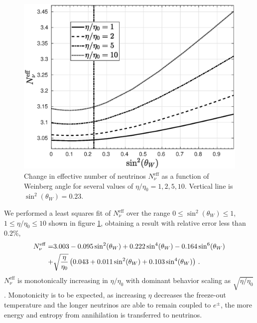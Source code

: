 \begin{figure}
\centerline{\includegraphics[width=0.90\columnwidth]{04-birrell/ParametricStudies/Figures/N_eff2.eps}}
\caption{Change in effective number of neutrinos  $N_\nu^{\mathrm{eff}}$ as a function of Weinberg angle for  several values of $\eta/\eta_0=1,2,5,10$. Vertical line is $\sin^2(\theta_W)=0.23$. }
\label{N_nu_params}  
 \end{figure}

We performed a least squares fit of $N_\nu^{\mathrm{eff}}$ over the range $0\leq \sin^2(\theta_W)\leq 1$, $1\leq \eta/\eta_0\leq 10$ shown in figure \ref{N_nu_params}, obtaining a result with relative error less than $0.2\%$,
\begin{align}
N_\nu^{\mathrm{eff}}=&3.003-0.095\sin^2(\theta_W) +0.222\sin^4(\theta_W ) -0.164\sin^6(\theta_W )\notag\\
+&\sqrt{\frac{\eta}{\eta_0}}\left(0.043+0.011\sin^2(\theta_W) +0.103\sin^4(\theta_W)\right)\,.
\end{align}
$N_\nu^{\mathrm{eff}}$ is monotonically increasing in $\eta/\eta_0$ with dominant behavior  scaling as $\sqrt{ \eta/\eta_0}$. Monotonicity is to be expected, as increasing $\eta$ decreases the freeze-out temperature and the longer neutrinos are able to remain coupled to $e^\pm$, the more energy and entropy from annihilation is transferred to neutrinos.

